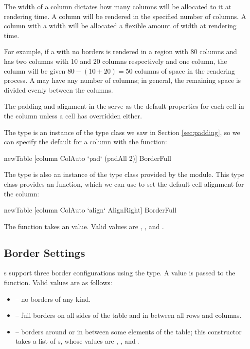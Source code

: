 The width of a column dictates how many columns will be allocated to
it at rendering time.  A  column will be rendered in the
specified number of columns.  A column with a  width will
be allocated a flexible amount of width at rendering time.

For example, if a  with no borders is rendered in a region
with 80 columns and has two  columns with 10 and 20
columns respectively and one  column, the 
column will be given $80 - (10 + 20) = 50$ columns of space in the
rendering process.  A  may have any number of 
columns; in general, the remaining space is divided evenly between the
 columns.

The padding and alignment in the  serve as the default
properties for each cell in the column unless a cell has overridden
either.

The  type is an instance of the  type
class we saw in Section \ref{sec:padding}, so we can specify the
default  for a column with the  function:

\begin{haskellcode}
 newTable [column ColAuto `pad` (padAll 2)] BorderFull
\end{haskellcode}

The  type is also an instance of the 
type class provided by the  module.  This type class
provides an  function, which we can use to set the default
cell alignment for the column:

\begin{haskellcode}
 newTable [column ColAuto `align` AlignRight] BorderFull
\end{haskellcode}

The  function takes an  value.  Valid values
are , , and .

\subsection{Border Settings}

s support three border configurations using the
 type.  A  value is passed to the
 function.  Valid values are as follows:

\begin{itemize}
\item {} -- no borders of any kind.
\item {} -- full borders on all sides of the table and in
  between all rows and columns.
\item {} -- borders around or in between some elements
  of the table; this constructor takes a list of s,
  whose values are , , and .
\end{itemize}

